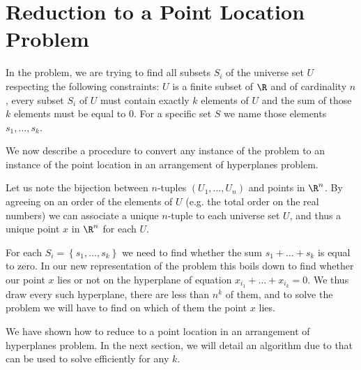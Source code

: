 \section{Reduction to a Point Location Problem}

In the \kSUM problem, we are trying to find all subsets $S_i$ of the universe set
$U$ respecting the following constraints: $U$ is a finite subset of $\R$ and of
cardinality $n$, every subset $S_i$ of $U$ must contain exactly
$k$ elements of $U$ and the sum of those $k$ elements must be equal to $0$.
For a specific set $S$ we name those elements $s_1, \dots, s_k$.

We now describe a procedure to convert any instance of the \kSUM problem to an
instance of the point location in an arrangement of hyperplanes problem.

Let us note the bijection between $n$-tuples $(U_1, \dots, U_n)$ and points in
$\R^n$. By agreeing on an order of the elements of $U$ (e.g. the total order on
the real numbers) we can associate a unique $n$-tuple to each universe set $U$,
and thus a unique point $x$ in $\R^n$ for each $U$.

For each $S_i = \left\{s_1, \dots, s_k\right\}$ we need to find whether the sum $s_1
+ \dots + s_k$ is equal to zero. In our new representation of the problem this
boils down to find whether our point $x$ lies or not on the hyperplane of
equation $x_{i_1} + \dots + x_{i_k} = 0$. We thus draw every such hyperplane,
there are less than $n^k$ of them, and to solve the problem
we will have to find on which of them the point $x$ lies.

We have shown how to reduce \kSUM to a point location in an
arrangement of hyperplanes problem. In the next section, we will detail an
algorithm due to \citet*{meiser:1993} that can be used to solve \kSUM
efficiently for any $k$.
